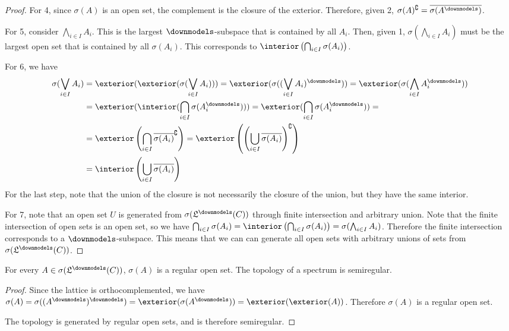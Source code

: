 \begin{mathSection}
\begin{proof}
		For 4, since $\sigma(A)$ is an open set, the complement is the closure of the exterior. Therefore, given 2, $\sigma(A)^{\complement} = \overline{\sigma(A^{\separate})}$.
		
		For 5, consider $\bigwedge_{i \in I} A_i$. This is the largest $\separate$-subspace that is contained by all $A_i$. Then, given 1, $\sigma\left(\bigwedge_{i \in I} A_i\right)$ must be the largest open set that is contained by all $\sigma(A_i)$. This corresponds to $\interior\left(\bigcap_{i \in I} \sigma(A_i)\right)$.
		
		For 6, we have
		\begin{align*}
			\sigma(\bigvee_{i \in I} A_i) &= \exterior(\exterior(\sigma(\bigvee_{i \in I} A_i))) = \exterior(\sigma((\bigvee_{i \in I} A_i)^{\separate})) = \exterior(\sigma(\bigwedge_{i \in I} A_i^{\separate})) \\
			&= \exterior(\interior(\bigcap_{i \in I} \sigma(A_i^{\separate}))) = \exterior(\bigcap_{i \in I} \sigma(A_i^{\separate})) =  \\
			&= \exterior\left(\bigcap_{i \in I}\overline{\sigma(A_i)}^{\complement}\right) = \exterior\left(\left(\bigcup_{i \in I}\overline{\sigma(A_i)}\right)^{\complement}\right) \\
			&= \interior\left(\bigcup_{i \in I}\overline{\sigma(A_i)}\right)
		\end{align*}
		For the last step, note that the union of the closure is not necessarily the closure of the union, but they have the same interior.
		
		For 7, note that an open set $U$ is generated from $\sigma(\mathfrak{L}^\separate(C))$ through finite intersection and arbitrary union. Note that the finite intersection of open sets is an open set, so we have $\bigcap_{i \in I} \sigma(A_i) = \interior\left(\bigcap_{i \in I} \sigma(A_i)\right) = \sigma(\bigwedge_{i \in I} A_i)$. Therefore the finite intersection corresponds to a $\separate$-subspace. This means that we can can generate all open sets with arbitrary unions of sets from $\sigma(\mathfrak{L}^\separate(C))$.
	\end{proof}
\end{mathSection}

\begin{coro}
	For every $A \in\sigma(\mathfrak{L}^\separate(C))$, $\sigma(A)$ is a regular open set. The topology of a spectrum is semiregular.
\end{coro}

\begin{proof}
	Since the lattice is orthocomplemented, we have $\sigma(A) = \sigma((A^{\separate})^{\separate}) = \exterior(\sigma(A^{\separate})) = \exterior(\exterior(A))$. Therefore $\sigma(A)$ is a regular open set.
	
	The topology is generated by regular open sets, and is therefore semiregular.
\end{proof}

